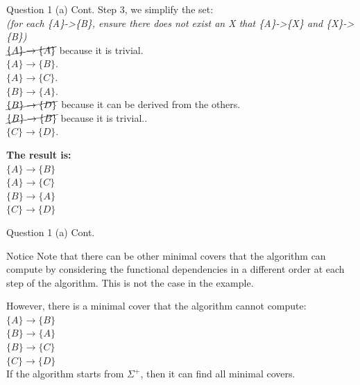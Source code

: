 \begin{frame}[fragile]{Question 1 (a) Cont.}
	Step 3, we simplify the set:\\\vspace{3pt}
	\textit{(for each \{A\}->\{B\}, ensure there does not exist an X that \{A\}->\{X\} and \{X\}->\{B\})}\\\vspace{5pt}
	$\cancel{\{A\} \rightarrow \{A\}}$ because it is trivial.\\	
	$\{A\} \rightarrow \{B\}$.\\	
	$\{A\} \rightarrow \{C\}$.\\	
	$\{B\} \rightarrow \{A\}$.\\	
	$\cancel{\{B\} \rightarrow \{D\}}$ because it can be derived from the others.\\	
	$\cancel{\{B\} \rightarrow \{B\}}$ because it is trivial..\\	
	$\{C\} \rightarrow \{D\}$.\\\vspace{5pt}
	
	\textbf{The result is:} \\\vspace{3pt}
	$\{A\} \rightarrow \{B\}$\\	
	$\{A\} \rightarrow \{C\}$\\	
	$\{B\} \rightarrow \{A\}$\\
	$\{C\} \rightarrow \{D\}$
\end{frame}

\begin{frame}[fragile]{Question 1 (a) Cont.}
	\begin{alertblock}{Notice}
	Note that there can be other minimal covers that the algorithm can compute by considering the functional dependencies in a different order at each step of the algorithm. This is not the case in the example.
	\end{alertblock}\vspace{5pt}

	However, there is a minimal cover that the algorithm cannot compute:\\\vspace{5pt}
	$\{A\} \rightarrow \{B\}$\\
	$\{B\} \rightarrow \{A\}$\\
	$\{B\} \rightarrow \{C\}$\\
	$\{C\} \rightarrow \{D\}$\\\vspace{10pt}	
	If the algorithm starts from $\Sigma^{+}$, then it can find all minimal covers.
\end{frame}


